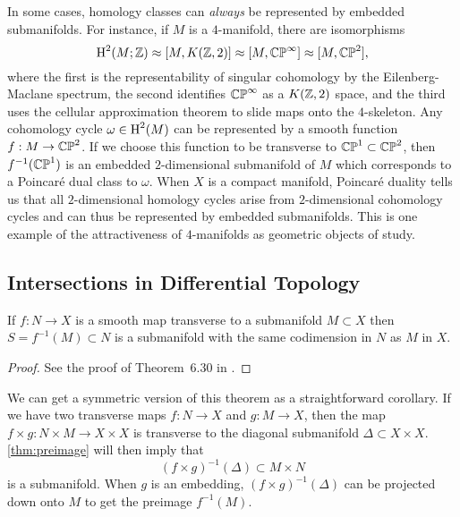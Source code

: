 \begin{remark}
	In some cases, homology classes can \emph{always} be represented by embedded submanifolds. For instance, if $M$ is a $4$-manifold, there are isomorphisms
	\begin{equation}
		\operatorname{H}^2(M; \mathbb{Z}) \approx [M, K(\mathbb{Z},2)] \approx [M, \mathbb{CP}^\infty] \approx [M,\mathbb{CP}^2],
	\end{equation}
	where the first is the representability of singular cohomology by the Eilenberg-Maclane spectrum, the second identifies $\mathbb{CP}^\infty$ as a $K(\mathbb{Z},2)$ space, and the third uses the cellular approximation theorem to slide maps onto the $4$-skeleton. Any cohomology cycle $\omega\in \operatorname{H}^2(M)$ can be represented by a smooth function $f : M \to \mathbb{CP}^2$. If we choose this function to be transverse to $\mathbb{CP}^1\subset \mathbb{CP}^2$, then $f^{-1}(\mathbb{CP}^1)$ is an embedded $2$-dimensional submanifold of $M$ which corresponds to a Poincar\'e dual class to $\omega$. When $X$ is a compact manifold, Poincar\'e duality tells us that all $2$-dimensional homology cycles arise from $2$-dimensional cohomology cycles and can thus be represented by embedded submanifolds. This is one example of the attractiveness of $4$-manifolds as geometric objects of study.
\end{remark}


\subsection{Intersections in Differential Topology}\label{sec:differential-topology-intersections}

\begin{theorem}\label{thm:preimage}
	If $f : N \to X$ is a smooth map transverse to a submanifold $M\subset X$ then $S=f^{-1}(M)\subset N$ is a submanifold with the same codimension in $N$ as $M$ in $X$.
\end{theorem}
\begin{proof}
	See the proof of Theorem~6.30 in \cite{lee2013smooth}.
\end{proof}

\begin{remark}\label{rmk:symmetric-preimage-theorem}
	We can get a symmetric version of this theorem as a straightforward corollary. If we have two transverse maps $f : N\to X$ and $g : M\to X$, then the map $f\times g : N\times M \to X\times X$ is transverse to the diagonal submanifold $\Delta\subset X\times X$. \cref{thm:preimage} will then imply that
	\[
		(f\times g)^{-1}(\Delta) \subset M\times N
	\]
	is a submanifold. When $g$ is an embedding, $(f\times g)^{-1}(\Delta)$ can be projected down onto $M$ to get the preimage $f^{-1}(M)$.
\end{remark}

